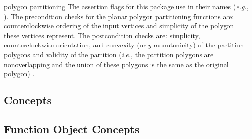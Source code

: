 
\begin{ccPackage}{polygon partitioning}
The assertion flags for this package use  in their names
({\em e.g.}, ).
The precondition checks for the planar polygon partitioning functions
are:  counterclockwise ordering of the input vertices and simplicity of the 
polygon these vertices represent.
The postcondition checks are:  simplicity, counterclockwise orientation,
and convexity (or $y$-monotonicity) of the partition polygons
and validity of the partition ({\em i.e.}, the partition polygons are 
nonoverlapping and the union of these polygons is the same as the
original polygon)
.
\end{ccPackage}

\subsection*{Concepts}


\lcHtml{







}

\subsection*{Function Object Concepts}

